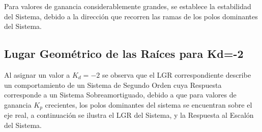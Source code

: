 \documentclass[12pt,letterpaper]{article}
\begin{document}
\begin{figure}[H]
\centering
{}
\end{figure}

Para valores de ganancia considerablemente grandes, se establece la estabilidad del Sistema, debido a la dirección que recorren las ramas de los polos dominantes del Sistema.

\subsection{Lugar Geométrico de las Raíces para Kd=-2}
Al asignar un valor a $K_{d}=-2$ se observa que el LGR correspondiente describe un comportamiento de un Sistema de Segundo Orden cuya Respuesta corresponde a un Sistema Sobreamortiguado, debido a que para valores de ganancia $K_{p}$ crecientes, los polos dominantes del sistema se encuentran sobre el eje real, a continuación se ilustra el LGR del Sistema, y la Respuesta al Escalón del Sistema.

\begin{figure}[H]
\centering
{}
\end{figure}
\end{document}
